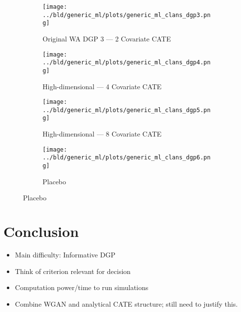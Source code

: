 \documentclass[11pt, a4paper, leqno]{article}
\begin{document}
\begin{figure}
    \caption{Simulation Results: Generic ML --- CLANS}\label{fig:clans}

    \centering
     \begin{subfigure}[b]{0.475\textwidth}
         \centering
         \texttt{[image: ../bld/generic\_ml/plots/generic\_ml\_clans\_dgp3.png]}
         \caption{Original WA DGP 3 --- 2 Covariate CATE}\label{fig_clans:dgp3}
     \end{subfigure}
     \hfill
     \begin{subfigure}[b]{0.475\textwidth}
         \centering
         \texttt{[image: ../bld/generic\_ml/plots/generic\_ml\_clans\_dgp4.png]}
         \caption{High-dimensional --- 4 Covariate CATE}\label{fig_clans:dgp4}
     \end{subfigure}

     \begin{subfigure}[b]{0.475\textwidth}
         \centering
         \texttt{[image: ../bld/generic\_ml/plots/generic\_ml\_clans\_dgp5.png]}
         \caption{High-dimensional --- 8 Covariate CATE}\label{fig_clans:dgp5}
     \end{subfigure}
     \begin{subfigure}[b]{0.475\textwidth}
         \centering
         \texttt{[image: ../bld/generic\_ml/plots/generic\_ml\_clans\_dgp6.png]}
         \caption{Placebo}\label{fig_clans:dgp6}
     \end{subfigure}



\end{figure}

\section{Conclusion}

\begin{itemize}
    \item Main difficulty: Informative DGP
    \item Think of criterion relevant for decision
    \item Computation power/time to run simulations
    \item Combine WGAN and analytical CATE structure; still need to justify this.
\end{itemize}

\clearpage
\newpage

\printbibliography
{}


\end{document}
